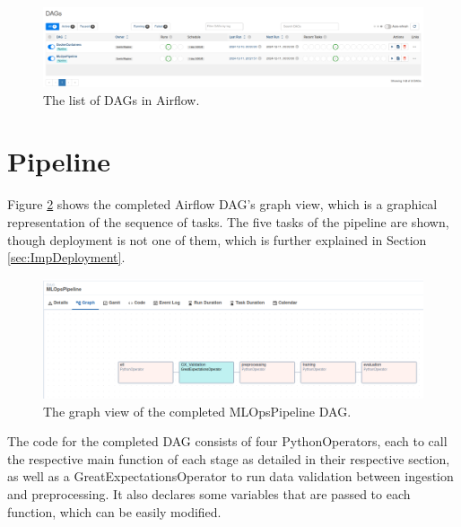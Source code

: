 \documentclass[12pt]{report}
\begin{document}
\begin{figure}[H]
    \centering
    \includegraphics[width=\linewidth]{Implementation/Airflow/DAGs/1.png}
    \caption{The list of DAGs in Airflow.}
    \label{fig:DAGsList}
\end{figure}

\section{Pipeline}
Figure \ref{fig:PipelineGraphDAG} shows the completed Airflow DAG's graph view, which is a graphical 
representation of the sequence of tasks. The five tasks of the pipeline are shown, 
though deployment is not one of them, which is further explained in Section \ref{sec:ImpDeployment}.

\begin{figure}[H]
    \centering
    \includegraphics[width=\linewidth]{Implementation/Airflow/DAGs/PipelineGraph.png}
    \caption{The graph view of the completed MLOpsPipeline DAG.}
    \label{fig:PipelineGraphDAG}
\end{figure}

The code for the completed DAG consists of four PythonOperators, each to call the respective main 
function of each stage as detailed in their respective section, as well as a GreatExpectationsOperator 
to run data validation between ingestion and preprocessing. It also declares some variables that are passed 
to each function, which can be easily modified.
\end{document}
